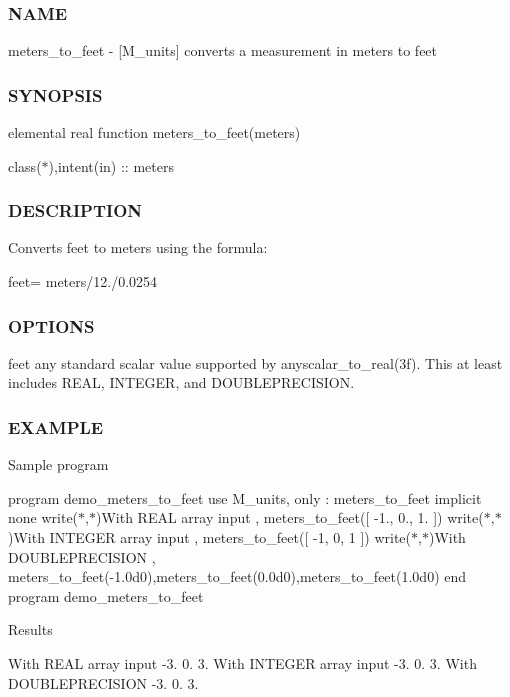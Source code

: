 \subsubsection*{N\+A\+ME}

meters\+\_\+to\+\_\+feet -\/ \mbox{[}M\+\_\+units\mbox{]} converts a measurement in meters to feet \subsubsection*{S\+Y\+N\+O\+P\+S\+IS}

elemental real function meters\+\_\+to\+\_\+feet(meters)

class($\ast$),intent(in) \+:\+: meters \subsubsection*{D\+E\+S\+C\+R\+I\+P\+T\+I\+ON}

Converts feet to meters using the formula\+:

feet= meters/12./0.0254 \subsubsection*{O\+P\+T\+I\+O\+NS}

feet any standard scalar value supported by anyscalar\+\_\+to\+\_\+real(3f). This at least includes R\+E\+AL, I\+N\+T\+E\+G\+ER, and D\+O\+U\+B\+L\+E\+P\+R\+E\+C\+I\+S\+I\+ON. \subsubsection*{E\+X\+A\+M\+P\+LE}

Sample program

program demo\+\_\+meters\+\_\+to\+\_\+feet use M\+\_\+units, only \+: meters\+\_\+to\+\_\+feet implicit none write($\ast$,$\ast$)\textquotesingle{}With R\+E\+AL array input \textquotesingle{}, meters\+\_\+to\+\_\+feet(\mbox{[} -\/1., 0., 1. \mbox{]}) write($\ast$,$\ast$)\textquotesingle{}With I\+N\+T\+E\+G\+ER array input \textquotesingle{}, meters\+\_\+to\+\_\+feet(\mbox{[} -\/1, 0, 1 \mbox{]}) write($\ast$,$\ast$)\textquotesingle{}With D\+O\+U\+B\+L\+E\+P\+R\+E\+C\+I\+S\+I\+ON \textquotesingle{}, meters\+\_\+to\+\_\+feet(-\/1.\+0d0),meters\+\_\+to\+\_\+feet(0.\+0d0),meters\+\_\+to\+\_\+feet(1.\+0d0) end program demo\+\_\+meters\+\_\+to\+\_\+feet

Results

With R\+E\+AL array input -\/3. 0. 3. With I\+N\+T\+E\+G\+ER array input -\/3. 0. 3. With D\+O\+U\+B\+L\+E\+P\+R\+E\+C\+I\+S\+I\+ON -\/3. 0. 3. 

